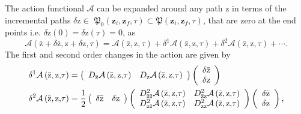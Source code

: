 \documentclass[aps,preprint]{revtex4}%
\begin{document}
The action functional $\mathcal{A}$ can be expanded around any path
$\mathrm{z}$ in terms of the incremental paths $\delta\mathrm{z}\in$
$\mathfrak{P}_{0}\left(  \mathbf{z}_{i},\mathbf{z}_{f},\tau\right)
\subset\mathfrak{P}\left(  \mathbf{z}_{i},\mathbf{z}_{f},\tau\right)  $, that
are zero at the end points i.e. $\delta\mathrm{z}\left(  0\right)
=\delta\mathrm{z}\left(  \tau\right)  =0$, as
\begin{equation}
\mathcal{A}\left(  \mathrm{\bar{z}}+\delta\mathrm{\bar{z}},\mathrm{z}%
+\delta\mathrm{z}\mathbf{,}\tau\right)  =\mathcal{A}\left(  \mathrm{\bar{z}%
},\mathrm{z}\mathbf{,}\tau\right)  +\delta^{1}\mathcal{A}\left(
\mathrm{\bar{z}},\mathrm{z}\mathbf{,}\tau\right)  +\delta^{2}\mathcal{A}%
\left(  \mathrm{\bar{z}},\mathrm{z}\mathbf{,}\tau\right)  +\cdots.
\label{vari}%
\end{equation}
The first and second order changes in the action are given by
\begin{align}
\delta^{1}\mathcal{A}\left(  \mathrm{\bar{z}},\mathrm{z}\mathbf{,}\tau\right)
&  =\left(
\begin{array}
[c]{cc}%
D_{\mathrm{\bar{z}}}\mathcal{A}\left(  \mathrm{\bar{z}},\mathrm{z}%
\mathbf{,}\tau\right)  & D_{\mathrm{z}}\mathcal{A}\left(  \mathrm{\bar{z}%
},\mathrm{z}\mathbf{,}\tau\right)
\end{array}
\right)  \left(
\begin{array}
[c]{c}%
\delta\mathrm{\bar{z}}\\
\delta\mathrm{z}%
\end{array}
\right) \\
\delta^{2}\mathcal{A}\left(  \mathrm{\bar{z}},\mathrm{z}\mathbf{,}\tau\right)
&  =\frac{1}{2}\left(
\begin{array}
[c]{cc}%
\delta\mathrm{\bar{z}} & \delta\mathrm{z}%
\end{array}
\right)  \left(
\begin{array}
[c]{cc}%
D_{\mathrm{\bar{z}\bar{z}}}^{2}\mathcal{A}\left(  \mathrm{\bar{z}}%
,\mathrm{z}\mathbf{,}\tau\right)  & D_{\mathrm{\bar{z}z}}^{2}\mathcal{A}%
\left(  \mathrm{\bar{z}},\mathrm{z}\mathbf{,}\tau\right) \\
D_{\mathrm{z\bar{z}}}^{2}\mathcal{A}\left(  \mathrm{\bar{z}},\mathrm{z}%
\mathbf{,}\tau\right)  & D_{\mathrm{zz}}^{2}\mathcal{A}\left(  \mathrm{\bar
{z}},\mathrm{z}\mathbf{,}\tau\right)
\end{array}
\right)  \left(
\begin{array}
[c]{c}%
\delta\mathrm{\bar{z}}\\
\delta\mathrm{z}%
\end{array}
\right)  , \label{actexp}%
\end{align}
\end{document}
